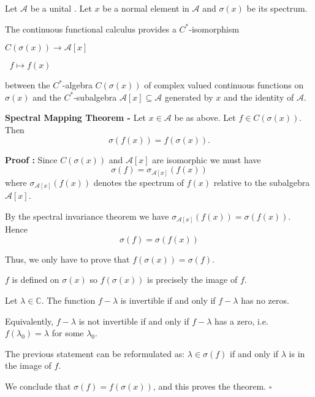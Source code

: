 \documentclass[12pt]{article}
\begin{document}
Let $\mathcal{A}$ be a unital . Let $x$ be a normal element in $\mathcal{A}$ and $\sigma(x)$ be its spectrum.

The continuous functional calculus provides a $C^*$-isomorphism
\begin{center}
$C(\sigma(x)) \longrightarrow \mathcal{A}[x]$

$\;\;f \mapsto f(x)$
\end{center}
between the $C^*$-algebra $C(\sigma(x))$ of complex valued continuous functions on $\sigma(x)$ and the $C^*$-subalgebra $\mathcal{A}[x] \subseteq \mathcal{A}$ generated by $x$ and the identity of $\mathcal{A}$.

{\bf Spectral Mapping Theorem -} Let $x \in \mathcal{A}$ be as above. Let $f \in C(\sigma(x))$. Then
\begin{displaymath}
\sigma(f(x))=f(\sigma(x)).
\end{displaymath}

{\bf Proof :} Since $C(\sigma(x))$ and $\mathcal{A}[x]$ are isomorphic we must have
\begin{displaymath}
\sigma(f) = \sigma_{\mathcal{A}[x]}(f(x))
\end{displaymath}
where $\sigma_{\mathcal{A}[x]}(f(x))$ denotes the spectrum of $f(x)$ relative to the subalgebra $\mathcal{A}[x]$.

By the spectral invariance theorem we have $\sigma_{\mathcal{A}[x]}(f(x))=\sigma(f(x))$. Hence
\begin{displaymath}
\sigma(f) = \sigma(f(x))
\end{displaymath}

Thus, we only have to prove that $f(\sigma(x)) = \sigma(f)$.

$f$ is defined on $\sigma(x)$ so $f(\sigma(x))$ is precisely the image of $f$.

Let $\lambda \in \mathbb{C}$. The function $f - \lambda$ is invertible if and only if $f - \lambda$ has no zeros.

Equivalently, $f - \lambda$ is not invertible if and only if $f - \lambda$ has a zero, i.e. $f(\lambda_0) = \lambda$ for some $\lambda_0$.

The previous statement can be reformulated as: $\lambda \in \sigma(f)$ if and only if $\lambda$ is in the image of $f$.

We conclude that $\sigma(f)=f(\sigma(x))$, and this proves the theorem. $\square$
\end{document}
